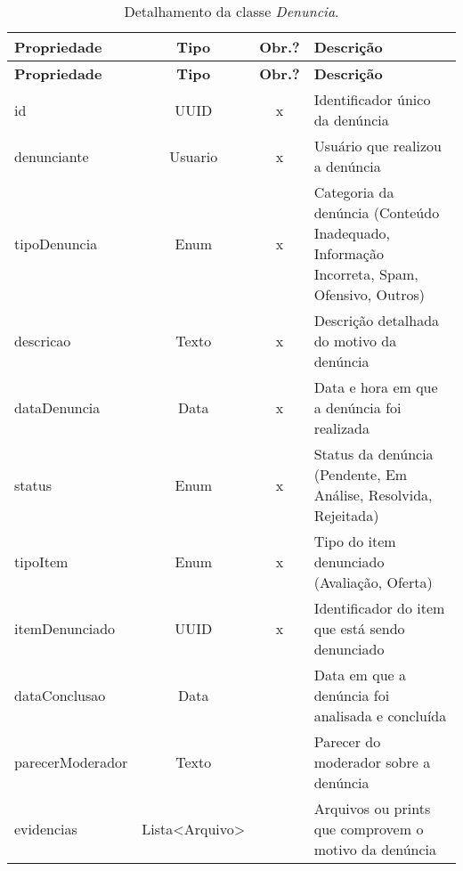 \begin{longtable}{|p{3.5cm}|c|c|p{8cm}|}
    \caption{Detalhamento da classe \emph{Denuncia}.}
    \label{tbl-dicionario-denuncia} \\\hline 
    
    \rowcolor{lightgray}
    \textbf{Propriedade} & \textbf{Tipo} & \textbf{Obr.?} & \textbf{Descrição} \\\hline
    \endfirsthead
    \hline
    \rowcolor{lightgray}
    \textbf{Propriedade} & \textbf{Tipo} & \textbf{Obr.?} & \textbf{Descrição} \\\hline
    \endhead
    
    id & UUID & x & Identificador único da denúncia \\\hline
    denunciante & Usuario & x & Usuário que realizou a denúncia \\\hline
    tipoDenuncia & Enum & x & Categoria da denúncia (Conteúdo Inadequado, Informação Incorreta, Spam, Ofensivo, Outros) \\\hline
    descricao & Texto & x & Descrição detalhada do motivo da denúncia \\\hline
    dataDenuncia & Data & x & Data e hora em que a denúncia foi realizada \\\hline
    status & Enum & x & Status da denúncia (Pendente, Em Análise, Resolvida, Rejeitada) \\\hline
    tipoItem & Enum & x & Tipo do item denunciado (Avaliação, Oferta) \\\hline
    itemDenunciado & UUID & x & Identificador do item que está sendo denunciado \\\hline
    dataConclusao & Data & & Data em que a denúncia foi analisada e concluída \\\hline
    parecerModerador & Texto & & Parecer do moderador sobre a denúncia \\\hline
    evidencias & Lista<Arquivo> & & Arquivos ou prints que comprovem o motivo da denúncia \\\hline
\end{longtable}
